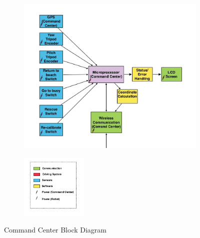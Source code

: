 \documentclass{article}
\begin{document}
\begin{figure}[H]
	\centering
\begin{subfigure}[b]{1\linewidth}		
	\begin{center}
	\centerline{\includegraphics[width=1.2\textwidth]{image/shahs_block_top.png}}
	\end{center}
\end{subfigure}
\begin{subfigure}[bH]{1\linewidth}
	\begin{center}
	\centerline{\includegraphics[width=0.35\textwidth]{image/shahs_block_legend.png}}
	\end{center}
	\end{subfigure}%
	\caption{Command Center Block Diagram}
\end{figure}
\end{document}
